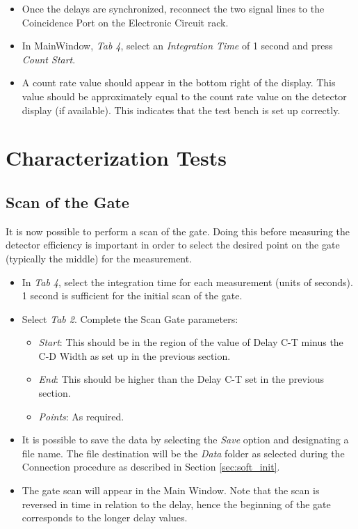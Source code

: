 \documentclass{article}
\begin{document}
\begin{itemize}
\item
Once the delays are synchronized, reconnect the two signal lines to the Coincidence Port on the Electronic Circuit rack.

\item
In MainWindow, \emph{Tab 4}, select an \emph{Integration Time} of 1 second and press \emph{Count Start}.

\item 
A count rate value should appear in the bottom right of the display. This value should be approximately equal to the count rate value on the detector display (if available). This indicates that the test bench is set up correctly. 



\end{itemize} 
 
 
\section{Characterization Tests}

\subsection{Scan of the Gate}


It is now possible to perform a scan of the gate. Doing this before measuring the detector efficiency is important in order to select the desired point on the gate (typically the middle) for the measurement.

\begin{itemize}
\item
In \emph{Tab 4}, select the integration time for each measurement (units of seconds). 1 second is sufficient for the initial scan of the gate.
\item
Select \emph{Tab 2}. Complete the Scan Gate parameters:
\begin{itemize}
\item
\emph{Start}: This should be in the region of the value of Delay C-T minus the C-D Width as set up in the previous section.
\item
\emph{End}: This should be higher than the Delay C-T set in the previous section.
\item
\emph{Points}: As required.
\end{itemize}

\item
It is possible to save the data by selecting the \emph{Save} option and designating a file name. The file destination will be the \emph{Data} folder as selected during the Connection procedure as described in Section \ref{sec:soft_init}.
\item
The gate scan will appear in the Main Window. Note that the scan is reversed in time in relation to the delay, hence the beginning of the gate corresponds to the longer delay values.
\end{itemize}
\end{document}
